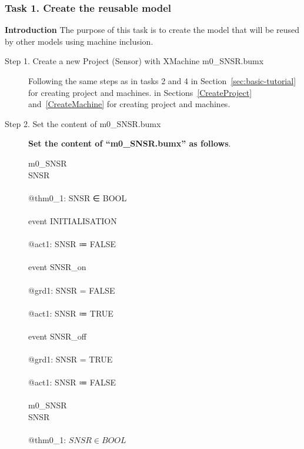 \subsubsection{Task 1. Create the reusable model}
\textbf{Introduction} The purpose of this task is to create the model that will be reused by other models using machine inclusion.
\begin{description}
\item[Step 1. Create a new Project (Sensor) with XMachine m0\_SNSR.bumx] 

Following the same steps as 
\ifplastex
in tasks 2 and 4 in Section~\ref{sec:basic-tutorial} for creating project and machines.
\else
in Sections~\ref{CreateProject} and~\ref{CreateMachine} for creating project and machines.
\fi

\item[Step 2. Set the content of m0\_SNSR.bumx] \textbf{Set the content of ``m0\_SNSR.bumx'' as follows}.
\begin{center}
	\begin{Bcode}
		\ifplastex
		\Bmachine{} m0_SNSR\\
		\Bvariables{} SNSR\\
		\Binvariants\\
                \Btheorem{} @thm0_1: SNSR ∈ BOOL\\
		\Bevents\\
		event INITIALISATION\\
		\Bthen\\
		@act1: SNSR ≔ FALSE\\
		\Bend\\
		event SNSR_on\\
		\Bwhere\\
		@grd1: SNSR = FALSE\\
		\Bthen\\
		@act1: SNSR ≔ TRUE\\
		\Bend\\
	    event SNSR_off\\
	    \Bwhere\\
	    @grd1: SNSR = TRUE\\
	    \Bthen\\
	    @act1: SNSR ≔ FALSE\\
	    \Bend\\
		\Bend
		\else
		\Bmachine{} m0_SNSR\\
		\Bvariables{} SNSR\\
		\Binvariants\\
		\Btab  \Btheorem{} @thm0_1: \(SNSR \in BOOL\)\\

\end{Bcode}
\end{center}
\end{description}
